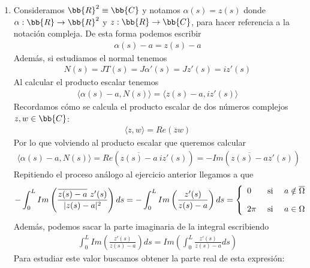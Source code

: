 \begin{observacion}
\begin{enumerate}[start=4]
        \item Consideramos $\bb{R}^2 \equiv \bb{C}$ y notamos $\alpha(s)=z(s)$ donde $\alpha:\bb{R}\to \bb{R}^2$ y $z:\bb{R} \to \bb{C}$, para hacer referencia a la notación compleja. De esta forma podemos escribir
        \begin{gather*}
            \alpha(s) - a = z(s)-a
        \end{gather*}
        Además, si estudiamos el normal tenemos
        \begin{gather*}
            N(s) = JT(s) = J\alpha'(s) = Jz'(s) = iz'(s)
        \end{gather*}
        Al calcular el producto escalar tenemos 
        \begin{gather*}
            \langle \alpha(s) - a, N(s) \rangle = \langle z(s)-a, iz'(s) \rangle
        \end{gather*}
        Recordamos cómo se calcula el producto escalar de dos números complejos $z,w\in \bb{C}$:
        \begin{gather*}
            \langle z, w \rangle = Re(\overline{z}w)
        \end{gather*}
        Por lo que volviendo al producto escalar que queremos calcular
        \begin{gather*}
            \langle \alpha(s) - a, N(s) \rangle = Re(\overline{z(s)-a}\ iz'(s)) = -Im(\overline{z(s)-a} z'(s))
        \end{gather*}
        Repitiendo el proceso análogo al ejercicio anterior llegamos a que 
        \begin{gather*}
            - \int_0^L Im \left(\frac{\overline{z(s)-a}\ z'(s)}{|z(s)-a|^2}\right) ds = - \int_0^L Im \left(\frac{z'(s)}{z(s)-a}\right) ds= 
            \left\{
                \begin{array}{l c c}
                    0 & \text{ si } & a\notin \overline{\Omega}\\[1em]
                    2\pi & \text{ si } & a\in \Omega
                \end{array}
            \right.
        \end{gather*}
        Además, podemos sacar la parte imaginaria de la integral escribiendo
        \begin{gather*}
            \int_0^L Im \left(\frac{z'(s)}{z(s)-a}\right) ds = Im \left( \int_0^L \frac{z'(s)}{z(s)-a}ds\right)
        \end{gather*}
        Para estudiar este valor buscamos obtener la parte real de esta expresión:
        \begin{align*}

\end{align*}
\end{enumerate}
\end{observacion}
